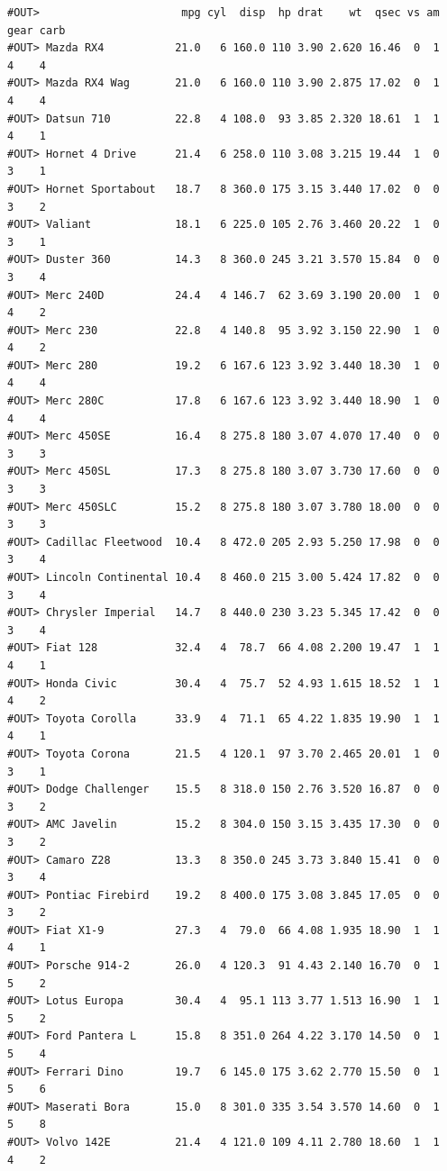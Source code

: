 \documentclass[]{book}
\theoremstyle{definition}
\theoremstyle{definition}
\theoremstyle{definition}
\theoremstyle{remark}
\begin{document}
\begin{verbatim}
#OUT>                      mpg cyl  disp  hp drat    wt  qsec vs am gear carb
#OUT> Mazda RX4           21.0   6 160.0 110 3.90 2.620 16.46  0  1    4    4
#OUT> Mazda RX4 Wag       21.0   6 160.0 110 3.90 2.875 17.02  0  1    4    4
#OUT> Datsun 710          22.8   4 108.0  93 3.85 2.320 18.61  1  1    4    1
#OUT> Hornet 4 Drive      21.4   6 258.0 110 3.08 3.215 19.44  1  0    3    1
#OUT> Hornet Sportabout   18.7   8 360.0 175 3.15 3.440 17.02  0  0    3    2
#OUT> Valiant             18.1   6 225.0 105 2.76 3.460 20.22  1  0    3    1
#OUT> Duster 360          14.3   8 360.0 245 3.21 3.570 15.84  0  0    3    4
#OUT> Merc 240D           24.4   4 146.7  62 3.69 3.190 20.00  1  0    4    2
#OUT> Merc 230            22.8   4 140.8  95 3.92 3.150 22.90  1  0    4    2
#OUT> Merc 280            19.2   6 167.6 123 3.92 3.440 18.30  1  0    4    4
#OUT> Merc 280C           17.8   6 167.6 123 3.92 3.440 18.90  1  0    4    4
#OUT> Merc 450SE          16.4   8 275.8 180 3.07 4.070 17.40  0  0    3    3
#OUT> Merc 450SL          17.3   8 275.8 180 3.07 3.730 17.60  0  0    3    3
#OUT> Merc 450SLC         15.2   8 275.8 180 3.07 3.780 18.00  0  0    3    3
#OUT> Cadillac Fleetwood  10.4   8 472.0 205 2.93 5.250 17.98  0  0    3    4
#OUT> Lincoln Continental 10.4   8 460.0 215 3.00 5.424 17.82  0  0    3    4
#OUT> Chrysler Imperial   14.7   8 440.0 230 3.23 5.345 17.42  0  0    3    4
#OUT> Fiat 128            32.4   4  78.7  66 4.08 2.200 19.47  1  1    4    1
#OUT> Honda Civic         30.4   4  75.7  52 4.93 1.615 18.52  1  1    4    2
#OUT> Toyota Corolla      33.9   4  71.1  65 4.22 1.835 19.90  1  1    4    1
#OUT> Toyota Corona       21.5   4 120.1  97 3.70 2.465 20.01  1  0    3    1
#OUT> Dodge Challenger    15.5   8 318.0 150 2.76 3.520 16.87  0  0    3    2
#OUT> AMC Javelin         15.2   8 304.0 150 3.15 3.435 17.30  0  0    3    2
#OUT> Camaro Z28          13.3   8 350.0 245 3.73 3.840 15.41  0  0    3    4
#OUT> Pontiac Firebird    19.2   8 400.0 175 3.08 3.845 17.05  0  0    3    2
#OUT> Fiat X1-9           27.3   4  79.0  66 4.08 1.935 18.90  1  1    4    1
#OUT> Porsche 914-2       26.0   4 120.3  91 4.43 2.140 16.70  0  1    5    2
#OUT> Lotus Europa        30.4   4  95.1 113 3.77 1.513 16.90  1  1    5    2
#OUT> Ford Pantera L      15.8   8 351.0 264 4.22 3.170 14.50  0  1    5    4
#OUT> Ferrari Dino        19.7   6 145.0 175 3.62 2.770 15.50  0  1    5    6
#OUT> Maserati Bora       15.0   8 301.0 335 3.54 3.570 14.60  0  1    5    8
#OUT> Volvo 142E          21.4   4 121.0 109 4.11 2.780 18.60  1  1    4    2
\end{verbatim}
\end{document}
